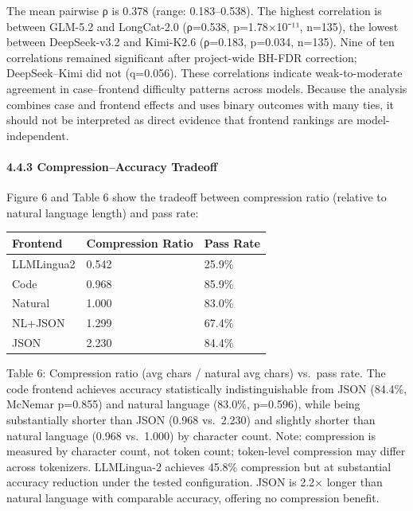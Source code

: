 The mean pairwise ρ is 0.378 (range: 0.183--0.538). The highest correlation is between GLM-5.2 and LongCat-2.0 (ρ=0.538, p=1.78×10⁻¹¹, n=135), the lowest between DeepSeek-v3.2 and Kimi-K2.6 (ρ=0.183, p=0.034, n=135). Nine of ten correlations remained significant after project-wide BH-FDR correction; DeepSeek--Kimi did not (q=0.056). These correlations indicate weak-to-moderate agreement in case--frontend difficulty patterns across models. Because the analysis combines case and frontend effects and uses binary outcomes with many ties, it should not be interpreted as direct evidence that frontend rankings are model-independent.



\paragraph{4.4.3 Compression--Accuracy Tradeoff}\label{compressionaccuracy-tradeoff}



Figure 6 and Table 6 show the tradeoff between compression ratio (relative to natural language length) and pass rate:



{\def\LTcaptype{none} %

\begin{longtable}[]{@{}lll@{}}

\toprule\noalign{}

Frontend & Compression Ratio & Pass Rate \\

\midrule\noalign{}

\endhead

\bottomrule\noalign{}

\endlastfoot

LLMLingua2 & 0.542 & 25.9\% \\

Code & 0.968 & 85.9\% \\

Natural & 1.000 & 83.0\% \\

NL+JSON & 1.299 & 67.4\% \\

JSON & 2.230 & 84.4\% \\

\end{longtable}

}



Table 6: Compression ratio (avg chars / natural avg chars) vs.~pass rate. The code frontend achieves accuracy statistically indistinguishable from JSON (84.4\%, McNemar p=0.855) and natural language (83.0\%, p=0.596), while being substantially shorter than JSON (0.968 vs.~2.230) and slightly shorter than natural language (0.968 vs.~1.000) by character count. Note: compression is measured by character count, not token count; token-level compression may differ across tokenizers. LLMLingua-2 achieves 45.8\% compression but at substantial accuracy reduction under the tested configuration. JSON is 2.2× longer than natural language with comparable accuracy, offering no compression benefit.



